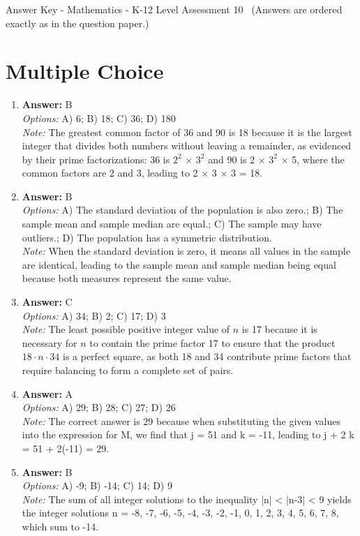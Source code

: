 \documentclass[12pt]{article}
\begin{document}
\begin{center}
Answer Key - Mathematics - K-12 Level Assessment 10 \
\small (Answers are ordered exactly as in the question paper.)
\end{center}

\section*{Multiple Choice}
\begin{enumerate}[label=\arabic*.]
\item \textbf{Answer:} B
\\ \textit{Options:} A) 6; B) 18; C) 36; D) 180
\\ \textit{Note:} The greatest common factor of 36 and 90 is 18 because it is the largest integer that divides both numbers without leaving a remainder, as evidenced by their prime factorizations: 36 is $2^2$ × $3^2$ and 90 is 2 × $3^2$ × 5, where the common factors are 2 and 3, leading to 2 × 3 × 3 = 18.
\item \textbf{Answer:} B
\\ \textit{Options:} A) The standard deviation of the population is also zero.; B) The sample mean and sample median are equal.; C) The sample may have outliers.; D) The population has a symmetric distribution.
\\ \textit{Note:} When the standard deviation is zero, it means all values in the sample are identical, leading to the sample mean and sample median being equal because both measures represent the same value.
\item \textbf{Answer:} C
\\ \textit{Options:} A) 34; B) 2; C) 17; D) 3
\\ \textit{Note:} The least possible positive integer value of \( n \) is 17 because it is necessary for \( n \) to contain the prime factor 17 to ensure that the product \( 18 \cdot n \cdot 34 \) is a perfect square, as both 18 and 34 contribute prime factors that require balancing to form a complete set of pairs.
\item \textbf{Answer:} A
\\ \textit{Options:} A) 29; B) 28; C) 27; D) 26
\\ \textit{Note:} The correct answer is 29 because when substituting the given values into the expression for M, we find that j = 51 and k = -11, leading to j + 2 k = 51 + 2(-11) = 29.
\item \textbf{Answer:} B
\\ \textit{Options:} A) -9; B) -14; C) 14; D) 9
\\ \textit{Note:} The sum of all integer solutions to the inequality |n| \textless{} |n-3| \textless{} 9 yields the integer solutions n = -8, -7, -6, -5, -4, -3, -2, -1, 0, 1, 2, 3, 4, 5, 6, 7, 8, which sum to -14.
\end{enumerate}
\end{document}
